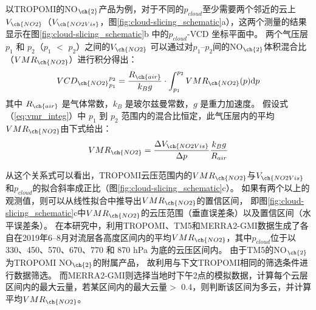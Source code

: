 以TROPOMI的NO$_{\ch{2}}$产品为例，对于不同的$p_{cloud}$至少需要两个邻近的云上$V_{\ch{NO2}}$（$V_{\ch{NO2Vis}}$，图\ref{fig:cloud-slicing_schematic}a），这两个测量的结果显示在图\ref{fig:cloud-slicing_schematic}b 中的$p_{cloud}$-VCD 坐标平面中。
两个气压层$p_1$ 和 $p_2$（$p_1$ $<$ $p_2$）之间的$V_{\ch{NO2}}$
可以通过对$p_1$--$p_2$间的NO$_{\ch{2}}$体积混合比（$VMR_{\ch{NO2}}$）进行积分得出：
\begin{equation} \label{eq:vmr_integ}
{VCD_{\ch{NO2}}}_{p_1}^{p_2}=\frac{R_{\ch{air}}}{k_Bg} \cdot \int_{p_1}^{p_2} VMR_{\ch{NO2}}(p) \mathrm{d} p
\end{equation}
其中 $R_{\ch{air}}$ 是气体常数，$k_B$ 是玻尔兹曼常数，$g$ 是重力加速度。
假设式（\ref{eq:vmr_integ}）中 $p_1$ 到 $p_2$ 范围内的混合比恒定，此气压层内的平均$VMR_{\ch{NO2}}$由下式给出：
\begin{equation}
VMR_{\ch{NO2}} = \frac{\Delta V_{\ch{NO2Vis}}}{\Delta p} \frac{k_B g}{R_{air}}
\end{equation}

从这个关系式可以看出，TROPOMI云压范围内的$VMR_{\ch{NO2}}$与$V_{\ch{NO2Vis}}$和$p_{cloud}$的拟合斜率成正比（图\ref{fig:cloud-slicing_schematic}c）。
如果有两个以上的观测值，则可以从线性拟合中推导出$VMR_{\ch{NO2}}$的置信区间，
即图\ref{fig:cloud-slicing_schematic}c中$VMR_{\ch{NO2}}$的云压范围（垂直误差条）以及置信区间（水平误差条）。
在本研究中，利用TROPOMI、TM5和MERRA2-GMI数据生成了各自在2019年6--8月对流层各高度区间内的平均$VMR_{\ch{NO2}}$，其中$p_{cloud}$位于以 330、450、570、670、770 和 870 hPa 为底的云压区间内。
由于TM5的NO$_{\ch{2}}$为TROPOMI NO$_{\ch{2}}$的附属产品，
故利用与下文TROPOMI相同的筛选条件进行数据筛选。
而MERRA2-GMI则选择当地时下午2点的模拟数据，计算每个云层区间内的最大云量，若某区间内的最大云量$>$ 0.4，则判断该区间为多云，并计算平均$VMR_{\ch{NO2}}$。


